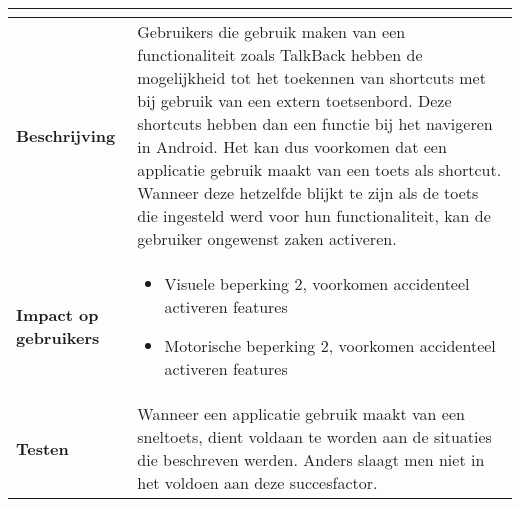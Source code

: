 \begin{table}[H]
\begin{tabular}{|l|p{12cm}|}
\begin{itemize}
        \end{itemize}                                                                                                                                                                                                                                                                                  \\ 
        \hline
        \textbf{Beschrijving}                 & Gebruikers die gebruik maken van een functionaliteit zoals TalkBack hebben de mogelijkheid tot het toekennen van shortcuts met bij gebruik van een extern toetsenbord. Deze shortcuts hebben dan een functie bij het navigeren in Android. Het kan dus voorkomen dat een applicatie gebruik maakt van een toets als shortcut. Wanneer deze hetzelfde blijkt te zijn als de toets die ingesteld werd voor hun functionaliteit, kan de gebruiker ongewenst zaken activeren. \\ 
        \hline
        \textbf{Impact op gebruikers}         &  
        \begin{itemize}
            \item Visuele beperking 2, voorkomen accidenteel activeren features
            \item Motorische beperking 2, voorkomen accidenteel activeren features
        \end{itemize}                                                                                                                                                                                                                                                                                                                                                                                                                    \\ 
      
        \hline
        \textbf{Testen}                       & Wanneer een applicatie gebruik maakt van een sneltoets, dient voldaan te worden aan de situaties die beschreven werden. Anders slaagt men niet in het voldoen aan deze succesfactor.                                                                                                                                                                                                       \\
        \hline
    \end{tabular}
\end{table}

